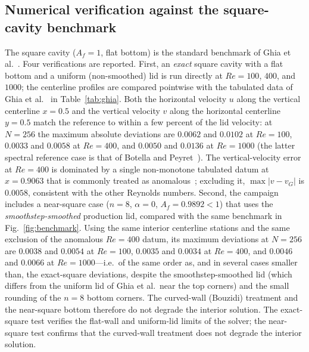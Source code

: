 \subsection{Numerical verification against the square-cavity benchmark}
\label{subsec:validation}

The square cavity ($A_f=1$, flat bottom) is the standard benchmark of Ghia et al.~\cite{Ghia1982}. Four verifications are reported. First, an \emph{exact} square cavity with a flat bottom and a uniform (non-smoothed) lid is run directly at $Re=100$, $400$, and $1000$; the centerline profiles are compared pointwise with the tabulated data of Ghia et al.~\cite{Ghia1982} in Table~\ref{tab:ghia}. Both the horizontal velocity $u$ along the vertical centerline $x=0.5$ and the vertical velocity $v$ along the horizontal centerline $y=0.5$ match the reference to within a few percent of the lid velocity: at $N=256$ the maximum absolute deviations are $0.0062$ and $0.0102$ at $Re=100$, $0.0033$ and $0.0058$ at $Re=400$, and $0.0050$ and $0.0136$ at $Re=1000$ (the latter spectral reference case is that of Botella and Peyret~\cite{Botella1998}). The vertical-velocity error at $Re=400$ is dominated by a single non-monotone tabulated datum at $x=0.9063$ that is commonly treated as anomalous~\cite{Chai2006}; excluding it, $\max|v-v_G|$ is $0.0058$, consistent with the other Reynolds numbers. Second, the campaign includes a near-square case ($n=8$, $\alpha=0$, $A_f=0.9892<1$) that uses the \emph{smoothstep-smoothed} production lid, compared with the same benchmark in Fig.~\ref{fig:benchmark}. Using the same interior centerline stations and the same exclusion of the anomalous $Re=400$ datum, its maximum deviations at $N=256$ are $0.0038$ and $0.0054$ at $Re=100$, $0.0035$ and $0.0034$ at $Re=400$, and $0.0046$ and $0.0066$ at $Re=1000$---i.e.\ of the same order as, and in several cases smaller than, the exact-square deviations, despite the smoothstep-smoothed lid (which differs from the uniform lid of Ghia et al.\ near the top corners) and the small rounding of the $n=8$ bottom corners. The curved-wall (Bouzidi) treatment and the near-square bottom therefore do not degrade the interior solution. The exact-square test verifies the flat-wall and uniform-lid limits of the solver; the near-square test confirms that the curved-wall treatment does not degrade the interior solution.

